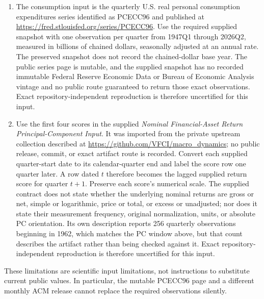 \documentclass[11pt]{article}
\begin{document}
\begin{enumerate}
The daily Treasury input contains yields only. Use the public \emph{ACM Term Premium 2026-07} daily
1--120 month asset, whose business-day observations begin on 14 June 1961 and run to the last
business day the release covers, at
\url{https://github.com/fernando-duarte/ACM_term_premium/releases/download/acm-term-premium-2026-07/ACMTermPremium_replicated_daily_1m_120m.csv.gz}.
Accept an existing copy only when its release identity and provenance agree with this request. If it
is absent, obtain that exact asset; if its identity cannot be confirmed, stop.
\item The consumption input is the quarterly U.S. real personal consumption expenditures series
identified as PCECC96 and published at \url{https://fred.stlouisfed.org/series/PCECC96}. Use the
required supplied snapshot with one observation per quarter from 1947Q1 through 2026Q2, measured in
billions of chained dollars, seasonally adjusted at an annual rate. The preserved snapshot does not
record the chained-dollar base year. The public series page is
mutable, and the supplied snapshot has no recorded immutable Federal Reserve Economic Data or Bureau of Economic Analysis
vintage and no public route guaranteed to return those exact observations. Exact
repository-independent reproduction is therefore uncertified for this input.
\item Use the first four scores in the supplied \emph{Nominal Financial-Asset Return
Principal-Component Input}. It was imported from the private upstream collection described at
\url{https://github.com/VFCI/macro_dynamics}; no public release, commit, or exact artifact route is
recorded. Convert each supplied quarter-start date to its calendar-quarter end and label the score row
one quarter later. A row dated \(t\) therefore becomes the lagged supplied return score for quarter
\(t+1\). Preserve each score's numerical scale. The supplied contract does not state whether the
underlying nominal returns are gross or net, simple or logarithmic, price or total, or excess or
unadjusted; nor does it state their measurement frequency, original normalization, units, or
absolute PC orientation. Its own description reports 256 quarterly observations beginning in 1962,
which matches the PC window above, but that count describes the artifact rather than being checked
against it.
Exact repository-independent reproduction is therefore uncertified for this input.
\end{enumerate}

These limitations are scientific input limitations, not instructions to substitute current public
values. In particular, the mutable PCECC96 page and a different monthly ACM release cannot replace
the required observations silently.
\end{document}
